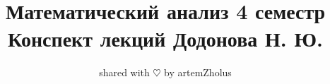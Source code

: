\documentclass{article}
\title{%
	Математический анализ 4 семестр \\
	\large Конспект лекций Додонова Н. Ю.}
\author{shared with $\heartsuit$ by artemZholus}
\date{}
\begin{document}
\theoremstyle{definition}
\newtheorem*{definition}{Определение}
\theoremstyle{plain}
\newtheorem{theorem}{Теорема}[section]
\newtheorem{axiom}{Аксиома}
\newtheorem{lemma}[theorem]{Лемма}
\newtheorem{statement}[theorem]{Утверждение}
\newtheorem{nb}[theorem]{N. B.}
\newtheorem{corollary}[theorem]{Следствие}
\theoremstyle{remark}
\newtheorem*{example}{Пример}
\newtheorem{property}[theorem]{Свойство}


\newcommand{\todo}{\textsc{\textbf{TODO}}}
\newcommand{\abs}[1]{\left|#1\right|}
\newcommand{\norm}[1]{\left\|#1\right\|}
\newcommand{\normp}[1]{\norm{#1}_p}
\newcommand{\normpp}[2]{\norm{#1}_{#2}}
\newcommand{\intl}[1]{\int\limits_{#1}}
\newcommand{\veel}[1]{\bigvee\limits_{#1}}
\newcommand{\veelr}[2]{\bigvee\limits_{#1}^{#2}}
\newcommand{\defeq}{\mathrel{\stackrel{\makebox[0pt]{\mbox{\normalfont\tiny def}}}{=}}}
\makeatletter
\newcommand*{\rom}[1]{\expandafter\@slowromancap\romannumeral #1@}
\makeatother
\newcommand{\iintl}[1]{\iint\limits_{#1}}
\newcommand{\pdiff}[2]{\frac{\partial #1}{\partial #2}}
\newcommand{\intlr}[2]{\int\limits_{#1}^{#2}}
\newcommand{\suml}[1]{\sum\limits_{#1}}
\newcommand{\sumlr}[2]{\sum\limits_{#1}^{#2}}
\newcommand{\feps}{\forall\varepsilon}
\newcommand{\Epsilon}{\varepsilon}
\newcommand{\scalarp}[2]{\langle #1 , #2\rangle}
\newcommand{\set}[1]{\left\{#1\right\}}
\maketitle
\tableofcontents
\newpage









\end{document}
